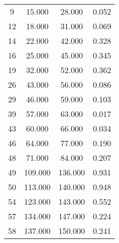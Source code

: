 % 
\begin{tabular}{cccc}
  \hline
  \hline
9 & 15.000 & 28.000 & 0.052 \\ 
  12 & 18.000 & 31.000 & 0.069 \\ 
  14 & 22.000 & 42.000 & 0.328 \\ 
  16 & 25.000 & 45.000 & 0.345 \\ 
  19 & 32.000 & 52.000 & 0.362 \\ 
  26 & 43.000 & 56.000 & 0.086 \\ 
  29 & 46.000 & 59.000 & 0.103 \\ 
  39 & 57.000 & 63.000 & 0.017 \\ 
  43 & 60.000 & 66.000 & 0.034 \\ 
  46 & 64.000 & 77.000 & 0.190 \\ 
  48 & 71.000 & 84.000 & 0.207 \\ 
  49 & 109.000 & 136.000 & 0.931 \\ 
  50 & 113.000 & 140.000 & 0.948 \\ 
  54 & 123.000 & 143.000 & 0.552 \\ 
  57 & 134.000 & 147.000 & 0.224 \\ 
  58 & 137.000 & 150.000 & 0.241 \\ 
   \hline
\end{tabular}
